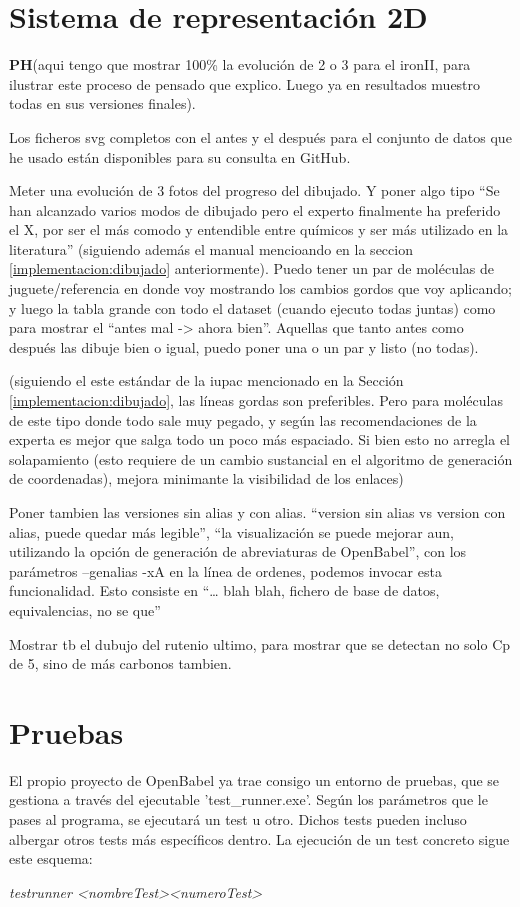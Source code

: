 \section{Sistema de representación 2D}

\textbf{PH}(aqui tengo que mostrar 100\% la evolución de 2 o 3 para el ironII, para ilustrar este proceso de pensado que explico. Luego ya en resultados muestro todas en sus versiones finales). 


Los ficheros svg completos con el antes y el después para el conjunto de datos que he usado están disponibles para su consulta en GitHub.

Meter una evolución de 3 fotos del progreso del dibujado. Y poner algo tipo “Se han alcanzado varios modos de dibujado pero el experto finalmente ha preferido el X, por ser el más comodo y entendible entre químicos y ser más utilizado en la literatura” (siguiendo además el manual mencioando en la seccion \ref{implementacion:dibujado} anteriormente). Puedo tener un par de moléculas de juguete/referencia en donde voy mostrando los cambios gordos que voy aplicando; y luego la tabla grande con todo el dataset (cuando ejecuto todas juntas) como para mostrar el “antes mal -> ahora bien”. Aquellas que tanto antes como después las dibuje bien o igual, puedo poner una o un par y listo (no todas).

(siguiendo el este estándar de la iupac mencionado en la Sección \ref{implementacion:dibujado}, las líneas gordas son preferibles. Pero para moléculas de este tipo donde todo sale muy pegado, y según las recomendaciones de la experta es mejor que salga todo un poco más espaciado. Si bien esto no arregla el solapamiento (esto requiere de un cambio sustancial en el algoritmo de generación de coordenadas), mejora minimante la visibilidad de los enlaces)

Poner tambien las versiones sin alias y con alias. “version sin alias vs version con alias, puede quedar más legible”, “la visualización se puede mejorar aun, utilizando la opción de generación de abreviaturas de OpenBabel”, con los parámetros --genalias -xA en la línea de ordenes, podemos invocar esta funcionalidad. Esto consiste en “… blah blah, fichero de base de datos, equivalencias, no se que”

Mostrar tb el dubujo del rutenio ultimo, para mostrar que se detectan no solo Cp de 5, sino de más carbonos tambien.

\section{Pruebas}
El propio proyecto de OpenBabel ya trae consigo un entorno de pruebas, que se gestiona a través del ejecutable 'test\_runner.exe'. Según los parámetros que le pases al programa, se ejecutará un test u otro. Dichos tests pueden incluso albergar otros tests más específicos dentro. La ejecución de un test concreto sigue este esquema: 
\begin{center}
    \textit{test\textunderscore runner \textless nombreTest\textgreater  \textless numeroTest\textgreater}    
\end{center}

